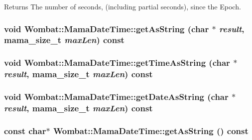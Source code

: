 \begin{DoxyReturn}{Returns}
The number of seconds, (including partial seconds), since the Epoch. 
\end{DoxyReturn}
\hypertarget{classWombat_1_1MamaDateTime_a71d88aab06c9b370d39dca53ab200894}{
\subsubsection[{getAsString}]{\setlength{\rightskip}{0pt plus 5cm}void Wombat::MamaDateTime::getAsString (char $\ast$ {\em result}, \/  {\bf mama\_\-size\_\-t} {\em maxLen}) const}}
\label{classWombat_1_1MamaDateTime_a71d88aab06c9b370d39dca53ab200894}
\hypertarget{classWombat_1_1MamaDateTime_af4390447a4a46a24e01212cf732a32f5}{
\subsubsection[{getTimeAsString}]{\setlength{\rightskip}{0pt plus 5cm}void Wombat::MamaDateTime::getTimeAsString (char $\ast$ {\em result}, \/  {\bf mama\_\-size\_\-t} {\em maxLen}) const}}
\label{classWombat_1_1MamaDateTime_af4390447a4a46a24e01212cf732a32f5}
\hypertarget{classWombat_1_1MamaDateTime_a12460a0fdf39d0faee5ea07bc3e3a180}{
\subsubsection[{getDateAsString}]{\setlength{\rightskip}{0pt plus 5cm}void Wombat::MamaDateTime::getDateAsString (char $\ast$ {\em result}, \/  {\bf mama\_\-size\_\-t} {\em maxLen}) const}}
\label{classWombat_1_1MamaDateTime_a12460a0fdf39d0faee5ea07bc3e3a180}
\hypertarget{classWombat_1_1MamaDateTime_ae88f2b09fb7c3c12f7c3f0cbfdea8147}{
\subsubsection[{getAsString}]{\setlength{\rightskip}{0pt plus 5cm}const char$\ast$ Wombat::MamaDateTime::getAsString () const}}
\label{classWombat_1_1MamaDateTime_ae88f2b09fb7c3c12f7c3f0cbfdea8147}


